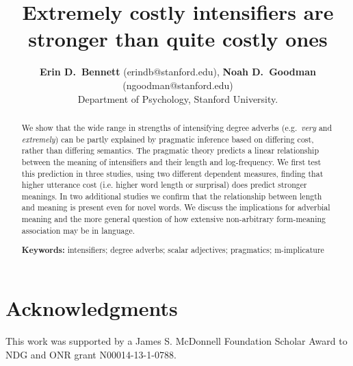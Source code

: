 \documentclass[10pt,letterpaper]{article}
\title{Extremely costly intensifiers are stronger than quite costly ones}
\author{{\large \bf Erin D.~Bennett} (erindb@stanford.edu), {\large \bf Noah D.~Goodman} (ngoodman@stanford.edu)\\
  Department of Psychology, Stanford University.}
\newcommand{\w}[1]{\emph{#1}}
\begin{document}
\maketitle

\begin{abstract}

We show that the wide range in strengths of intensifying degree adverbs (e.g.~\w{very} and \w{extremely}) can be partly explained by pragmatic inference based on differing cost, rather than differing semantics.
The pragmatic theory predicts a linear relationship between the meaning of intensifiers and their length and log-frequency.
We first test this prediction in three studies, using two different dependent measures, finding that higher utterance cost (i.e. higher word length or surprisal) does predict stronger meanings.
In two additional studies we confirm that the relationship between length and meaning is present even for novel words.
We discuss the implications for adverbial meaning and the more general question of how extensive non-arbitrary form-meaning association may be in language.

\textbf{Keywords:} 
intensifiers; degree adverbs; scalar adjectives; pragmatics; m-implicature
\end{abstract}













\section{Acknowledgments}

This work was supported by a James S. McDonnell Foundation Scholar Award to NDG and ONR grant N00014-13-1-0788.



\setlength{\bibleftmargin}{.125in}
\setlength{\bibindent}{-\bibleftmargin}




\end{document}
